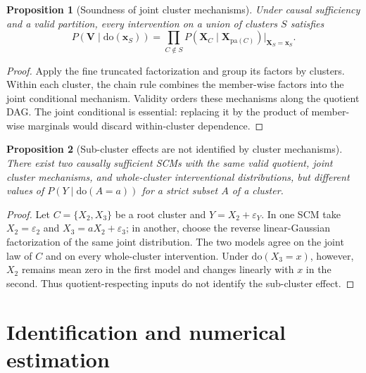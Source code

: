 \documentclass[twoside]{article}
\newtheorem{proposition}{Proposition}
\newcommand{\doo}{\mathrm{do}}
\begin{document}
\begin{proposition}[Soundness of joint cluster mechanisms]
\label{prop:cluster-soundness}
Under causal sufficiency and a valid partition, every intervention on a
union of clusters $S$ satisfies
\[
 P(\mathbf V\mid\doo(\mathbf x_S))
 =\prod_{C\notin S}
 P(\mathbf X_C\mid\mathbf X_{\mathrm{pa}(C)})
 \big|_{\mathbf X_S=\mathbf x_S}.
\]
\end{proposition}

\begin{proof}
Apply the fine truncated factorization and group its factors by clusters.
Within each cluster, the chain rule combines the member-wise factors into
the joint conditional mechanism. Validity orders these mechanisms along the
quotient DAG. The joint conditional is essential: replacing it by the
product of member-wise marginals would discard within-cluster dependence.
\end{proof}

\begin{proposition}[Sub-cluster effects are not identified by cluster mechanisms]
\label{prop:qexposure}
There exist two causally sufficient SCMs with the same valid quotient, joint
cluster mechanisms, and whole-cluster interventional distributions, but
different values of $P(Y\mid\doo(A=a))$ for a strict subset $A$ of a
cluster.
\end{proposition}

\begin{proof}
Let $C=\{X_2,X_3\}$ be a root cluster and $Y=X_2+\varepsilon_Y$. In one
SCM take $X_2=\varepsilon_2$ and $X_3=aX_2+\varepsilon_3$; in another,
choose the reverse linear-Gaussian factorization of the same joint
distribution. The two models agree on the joint law of $C$ and on every
whole-cluster intervention. Under $\doo(X_3=x)$, however, $X_2$ remains
mean zero in the first model and changes linearly with $x$ in the second.
Thus quotient-respecting inputs do not identify the sub-cluster effect.
\end{proof}

\clearpage
\section{Identification and numerical estimation}
\label{app:estimators}
\end{document}
